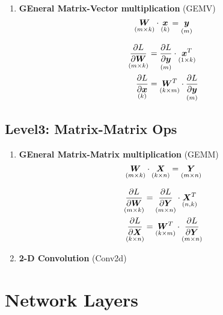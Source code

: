 \documentclass[9pt,twocolumn,times]{article}
\begin{document}
\begin{enumerate}[leftmargin=*]
\item \textbf{GEneral Matrix-Vector multiplication} (GEMV)
\begin{equation}
	\underset{(m\times k)}{{\bm{W}}} \cdot \underset{(k)}{{\bm{x}}} =
	\underset{(m)}{{\bm{y}}}
\end{equation}
\begin{center}
	\resizebox{0.618\columnwidth}{!}{%
		
	}
\end{center}
\begin{align}
	\underset{(m\times k)}{\frac{\partial L}{\partial{\bm{W}}}} &=
	\underset{(m)}{\frac{\partial L}{\partial{\bm{y}}}} \cdot
	\underset{(1\times k)}{{\bm{x}}^T}\\
	\underset{(k)}{\frac{\partial L}{\partial{\bm{x}}}} &=
	\underset{(k\times m)}{{\bm{W}}^T} \cdot
	\underset{(m)}{\frac{\partial L}{\partial {\bm{y}}}}
\end{align}

\end{enumerate}

\subsection{Level3: Matrix-Matrix Ops}

\begin{enumerate}[leftmargin=*]
\item \textbf{GEneral Matrix-Matrix multiplication} (GEMM)
\begin{equation}
	\underset{(m\times k)}{{\bm{W}}} \cdot
	\underset{(k\times n)}{{\bm{X}}} =
	\underset{(m\times n)}{{\bm{Y}}}
\end{equation}
\begin{center}
	\resizebox{0.618\columnwidth}{!}{%
		
	}
\end{center}
\begin{align}
	\underset{(m\times k)}{\frac{\partial L}{\partial{\bm{W}}}} &=
	\underset{(m\times n)}{\frac{\partial L}{\partial{\bm{Y}}}} \cdot
	\underset{(n,k)}{{\bm{X}}^T}\\
	\underset{(k\times n)}{\frac{\partial L}{\partial{\bm{X}}}} &=
	\underset{(k\times m)}{{\bm{W}}^T} \cdot
	\underset{(m\times n)}{\frac{\partial L}{\partial {\bm{Y}}}}
\end{align}

\item \textbf{2-D Convolution} (Conv2d)
\end{enumerate}

\section{Network Layers}
\end{document}
